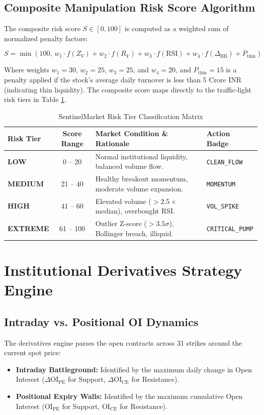\subsection{Composite Manipulation Risk Score Algorithm}
The composite risk score $S \in [0, 100]$ is computed as a weighted sum of normalized penalty factors:

\begin{equation}
S = \min\left(100, \, w_1 \cdot f(Z_V) + w_2 \cdot f(R_V) + w_3 \cdot f(\text{RSI}) + w_4 \cdot f(\Delta_{\text{BB}}) + P_{\text{thin}}\right)
\end{equation}

Where weights $w_1 = 30$, $w_2 = 25$, $w_3 = 25$, and $w_4 = 20$, and $P_{\text{thin}} = 15$ is a penalty applied if the stock's average daily turnover is less than 5 Crore INR (indicating thin liquidity). The composite score maps directly to the traffic-light risk tiers in Table \ref{tab:risk_tiers}.

\begin{table}[H]
\centering
\caption{SentinelMarket Risk Tier Classification Matrix}
\label{tab:risk_tiers}
\begin{tabularx}{\textwidth}{@{}lcXl@{}}
\toprule
\textbf{Risk Tier} & \textbf{Score Range} & \textbf{Market Condition \& Rationale} & \textbf{Action Badge} \\
\midrule
\textbf{LOW} & 0 -- 20 & Normal institutional liquidity, balanced volume flow. & \texttt{CLEAN\_FLOW} \\
\textbf{MEDIUM} & 21 -- 40 & Healthy breakout momentum, moderate volume expansion. & \texttt{MOMENTUM} \\
\textbf{HIGH} & 41 -- 60 & Elevated volume ($>2.5\times$ median), overbought RSI. & \texttt{VOL\_SPIKE} \\
\textbf{EXTREME} & 61 -- 100 & Outlier Z-score ($>3.5\sigma$), Bollinger breach, illiquid. & \texttt{CRITICAL\_PUMP} \\
\bottomrule
\end{tabularx}
\end{table}

\section{Institutional Derivatives Strategy Engine}

\subsection{Intraday vs. Positional OI Dynamics}
The derivatives engine parses the open contracts across 31 strikes around the current spot price:
\begin{itemize}
    \item \textbf{Intraday Battleground:} Identified by the maximum daily change in Open Interest ($\Delta \text{OI}_{\text{PE}}$ for Support, $\Delta \text{OI}_{\text{CE}}$ for Resistance).
    \item \textbf{Positional Expiry Walls:} Identified by the maximum cumulative Open Interest ($\text{OI}_{\text{PE}}$ for Support, $\text{OI}_{\text{CE}}$ for Resistance).
\end{itemize}

